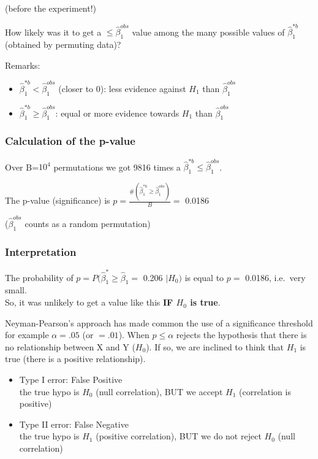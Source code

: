 \documentclass[
]{article}
\providecommand{\tightlist}{%
  \setlength{\itemsep}{0pt}\setlength{\parskip}{0pt}}
\begin{document}
(before the experiment!)

How likely was it to get a \(\leq \hat{\beta}_1 ^{obs}\) value among the
many possible values of \(\hat{\beta}_1 ^{*b}\) (obtained by permuting
data)?

Remarks:

\begin{itemize}
\tightlist
\item
  \(\hat{\beta}_1 ^{* b}< \hat{\beta}_1 ^{obs}\) (closer to 0): less
  evidence against \(H_1\) than \(\hat{\beta}_1 ^{obs}\)
\item
  \(\hat{\beta}_1 ^{* b} \geq \hat{\beta}_1 ^{obs}\): equal or more
  evidence towards \(H_1\) than \(\hat{\beta}_1 ^{obs}\)
\end{itemize}

\hypertarget{calculation-of-the-p-value}{%
\subsubsection{Calculation of the
p-value}\label{calculation-of-the-p-value}}

Over B=\ensuremath{10^{4}} permutations we got 9816 times a
\(\hat{\beta}_1 ^{* b} \leq \hat{\beta}_1 ^{obs}\).

The p-value (significance) is
\(p=\frac{\# (\hat{\beta}_1 ^{* b} \geq \hat{\beta}_1 ^{obs})}{B} =\)
0.0186

(\(\hat{\beta}_1 ^{obs}\) counts as a random permutation)

\hypertarget{interpretation}{%
\subsubsection{Interpretation}\label{interpretation}}

The probability of \(p=P (\hat{\beta}_1 ^ * \geq \hat{\beta}_1=\) 0.206
\(| H_0)\) is equal to \(p =\) 0.0186, i.e.~very small.\\
So, it was unlikely to get a value like this \textbf{IF \(H_0\) is
true}.

Neyman-Pearson's approach has made common the use of a significance
threshold for example \(\alpha=.05\) (or \(=. 01\)). When
\(p \leq \alpha\) rejects the hypothesis that there is no relationship
between X and Y (\(H_0\)). If so, we are inclined to think that \(H_1\)
is true (there is a positive relationship).

\begin{itemize}
\tightlist
\item
  Type I error: False Positive\\
  the true hypo is \(H_0\) (null correlation), BUT we accept \(H_1\)
  (correlation is positive)
\item
  Type II error: False Negative\\
  the true hypo is \(H_1\) (positive correlation), BUT we do not reject
  \(H_0\) (null correlation)
\end{itemize}
\end{document}
